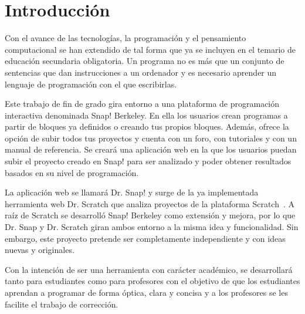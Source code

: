 \documentclass[a4paper, 12pt]{book}
\begin{document}
\tableofcontents 
\cleardoublepage
\listoffigures %



\cleardoublepage
\chapter{Introducción}
\label{sec:intro} %
Con el avance de las tecnologías, la programación y el pensamiento computacional se han extendido de tal forma que ya se incluyen en el temario de educación secundaria obligatoria. Un programa no es más que un conjunto de sentencias que dan instrucciones a un ordenador y es necesario aprender un lenguaje de programación con el que escribirlas.

Este trabajo de fin de grado gira entorno a una plataforma de programación interactiva denominada Snap! Berkeley. En ella los usuarios crean programas a partir de bloques ya definidos o creando tus propios bloques. Además, ofrece la opción de subir todos tus proyectos y cuenta con un foro, con tutoriales y con un manual de referencia. Se creará una aplicación web en la que los usuarios puedan subir el proyecto creado en Snap! para ser analizado y poder obtener resultados basados en su nivel de programación. 

La aplicación web se llamará Dr. Snap! y surge de la ya implementada herramienta web Dr. Scratch que analiza proyectos de la plataforma Scratch~\cite{moreno2015dr}. A raíz de Scratch se desarrolló Snap! Berkeley como extensión y mejora, por lo que Dr. Snap y Dr. Scratch giran ambos entorno a la misma idea y funcionalidad. Sin embargo, este proyecto pretende ser completamente independiente y con ideas nuevas y originales.

Con la intención de ser una herramienta con carácter académico, se desarrollará tanto para estudiantes como para profesores con el objetivo de que los estudiantes aprendan a programar de forma óptica, clara y concisa y a los profesores se les facilite el trabajo de corrección.
\end{document}
